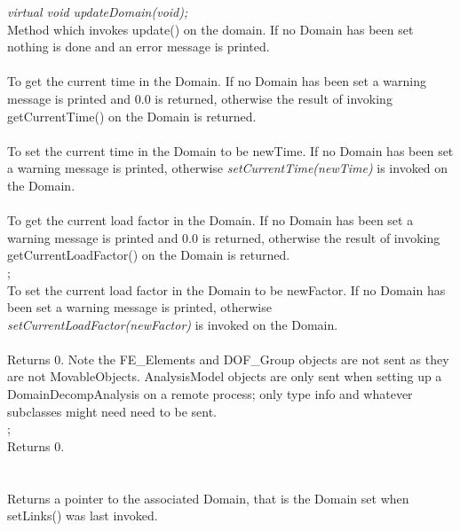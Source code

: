 {\em virtual void updateDomain(void);}\\
Method which invokes update() on the domain. If no Domain has
been set nothing is done and an error message is printed. \\ 

 \\
To get the current time in the Domain. If no Domain has been set a
warning message is printed and $0.0$ is returned, otherwise the result
of invoking getCurrentTime() on the Domain is returned. \\

\\
To set the current time in the Domain to be \p newTime. If no
Domain has been set a warning message is printed, otherwise 
{\em setCurrentTime(newTime)} is invoked on the Domain. \\

\\
To get the current load factor in the Domain. If no Domain has been set a
warning message is printed and $0.0$ is returned, otherwise the result
of invoking getCurrentLoadFactor() on the Domain is returned. \\

;\\
To set the current load factor in the Domain to be \p newFactor. If no
Domain has been set a warning message is printed, otherwise 
{\em setCurrentLoadFactor(newFactor)} is invoked on the Domain. \\

\\ 
Returns $0$. Note the FE\_Elements and DOF\_Group objects are not sent
as they are not MovableObjects. AnalysisModel objects are only sent
when setting up a DomainDecompAnalysis on a remote process; only type
info and whatever subclasses might need need to be sent.\\

\indent{};\\
Returns $0$.  \\

  \\
 \\
Returns a pointer to the associated Domain, that is the Domain
set when setLinks() was last invoked. 



